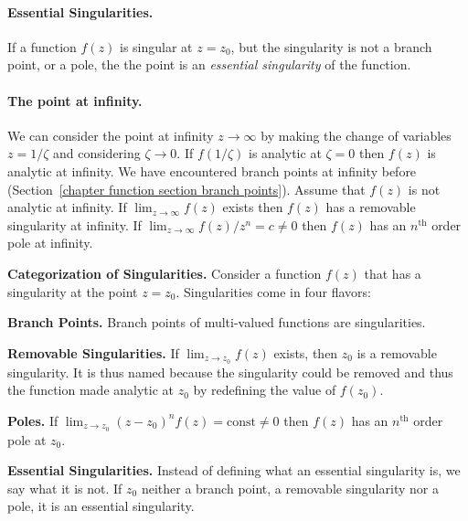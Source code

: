 \paragraph{Essential Singularities.}
If a function $f(z)$ is singular at $z = z_0$, but the singularity is not a 
branch point, or a pole, the the point is an 
\textit{essential singularity} of the function.




\paragraph{The point at infinity.}
We can consider the point at infinity $z \to \infty$ by making the change of 
variables $z = 1 / \zeta$ and considering $\zeta \to 0$.  If $f(1 / \zeta)$ is analytic
at $\zeta = 0$ then $f(z)$ is analytic at infinity.  We have encountered branch
points at infinity before 
(Section~\ref{chapter function section branch points}).
Assume that $f(z)$ is not analytic at infinity.  If $\lim_{z \to \infty} f(z)$
exists then $f(z)$ has a removable singularity at infinity.
If $\lim_{z \to \infty} f(z) / z^n = c \neq 0$ then $f(z)$ has an $n^{\mathrm{th}}$ order pole
at infinity.






\begin{Result}
  \textbf{Categorization of Singularities.}
  Consider a function $f(z)$ that has a singularity at the point $z = z_0$.
  Singularities come in four flavors:
  \begin{description}
  \item{\textbf{Branch Points.}}
    Branch points of multi-valued functions are singularities.
  \item{\textbf{Removable Singularities.}}
    If $\lim_{z \to z_0} f(z)$ exists, then $z_0$ is a removable singularity.
    It is thus named because the singularity could be removed and thus 
    the function made analytic at $z_0$ by redefining the value of 
    $f\left( z_0 \right)$.
  \item{\textbf{Poles.}}
    If $\lim_{z \to z_0} \left( z - z_0 \right)^n f(z) = \mathrm{const} \neq 0$
    then $f(z)$ has an $n^{\mathrm{th}}$ order pole at $z_0$.
  \item{\textbf{Essential Singularities.}}
    Instead of defining what an essential singularity is, we say what 
    it is not.
    If $z_0$ neither a branch point, a removable singularity nor a pole, it 
    is an essential singularity.
  \end{description}
\end{Result}



